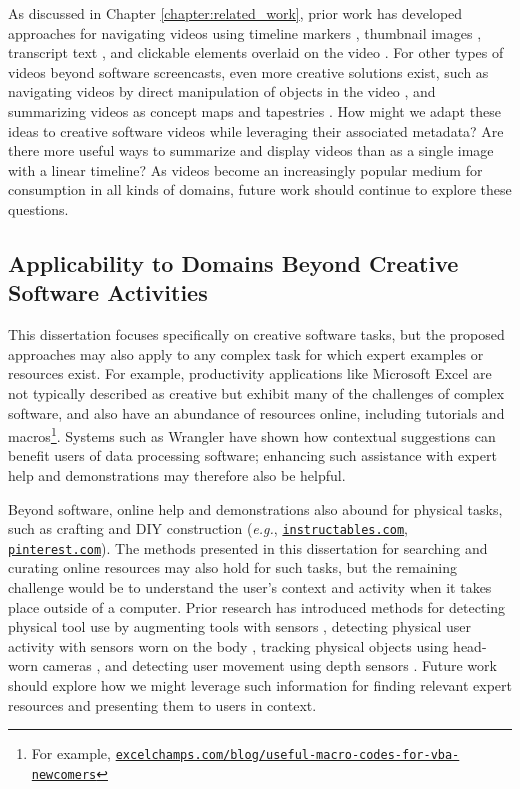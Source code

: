 As discussed in Chapter \ref{chapter:related_work}, prior work has developed approaches for navigating videos using timeline markers \cite{Matejka2011, Grossman2010, Kim2014, Banovic2012, Kim2014a}, thumbnail images \cite{Kim2014a, Pongnumkul2011, Banovic2012, Grossman2010a, Chi2012, Pavel2014}, transcript text \cite{Kim2014a}, and clickable elements overlaid on the video \cite{Nguyen2015}. For other types of videos beyond software screencasts, even more creative solutions exist, such as navigating videos by direct manipulation of objects in the video \cite{Goldman2008}, and summarizing videos as concept maps \cite{Liu2018} and tapestries \cite{Barnes2010}. How might we adapt these ideas to creative software videos while leveraging their associated metadata? Are there more useful ways to summarize and display videos than as a single image with a linear timeline? As videos become an increasingly popular medium for consumption in all kinds of domains, future work should continue to explore these questions.

\subsection{Applicability to Domains Beyond Creative Software Activities}
This dissertation focuses specifically on creative software tasks, but the proposed approaches may also apply to any complex task for which expert examples or resources exist. For example, productivity applications like Microsoft Excel are not typically described as creative but exhibit many of the challenges of complex software, and also have an abundance of resources online, including tutorials and macros\footnote{For example, \href{https://excelchamps.com/blog/useful-macro-codes-for-vba-newcomers/}{\nolinkurl{excelchamps.com/blog/useful-macro-codes-for-vba-newcomers}}}. Systems such as Wrangler \cite{Kandel2011} have shown how contextual suggestions can benefit users of data processing software; enhancing such assistance with expert help and demonstrations may therefore also be helpful.

Beyond software, online help and demonstrations also abound for physical tasks, such as crafting and DIY construction (\textit{e.g.}, \href{https://www.instructables.com/}{\nolinkurl{instructables.com}}, \href{https://www.pinterest.com/}{\nolinkurl{pinterest.com}}). The methods presented in this dissertation for searching and curating online resources may also hold for such tasks, but the remaining challenge would be to understand the user's context and activity when it takes place outside of a computer. Prior research has introduced methods for detecting physical tool use by augmenting tools with sensors \cite{Schoop2016, Antifakos2002}, detecting physical user activity with sensors worn on the body \cite{Lukowicz2004}, tracking physical objects using head-worn cameras \cite{Henderson2011}, and detecting user movement using depth sensors \cite{Anderson2013}. Future work should explore how we might leverage such information for finding relevant expert resources and presenting them to users in context.

